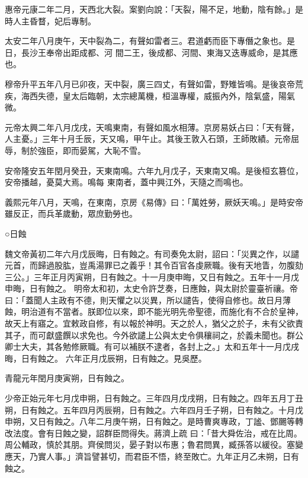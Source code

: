 \begin{pinyinscope}
 惠帝元康二年二月，天西北大裂。案劉向說：「天裂，陽不足，地動，陰有餘。」是時人主昏瞀，妃后專制。



 太安二年八月庚午，天中裂為二，有聲如雷者三。君道虧而臣下專僭之象也。是日，長沙王奉帝出距成都、河
 間二王，後成都、河間、東海又迭專威命，是其應也。



 穆帝升平五年八月已卯夜，天中裂，廣三四丈，有聲如雷，野雉皆鳴。是後哀帝荒疾，海西失德，皇太后臨朝，太宗總萬機，桓溫專權，威振內外，陰氣盛，陽氣微。



 元帝太興二年八月戊戌，天鳴東南，有聲如風水相薄。京房易妖占曰：「天有聲，人主憂。」三年十月壬辰，天又鳴，甲午止。其後王敦入石頭，王師敗績。元帝屈辱，制於強臣，即而晏駕，大恥不雪。



 安帝隆安五年閏月癸丑，天東南鳴。六年九月戊子，天東南又鳴。是後桓玄篡位，安帝播越，憂莫大焉。鳴每
 東南者，蓋中興江外，天隨之而鳴也。



 義熙元年八月，天鳴，在東南，京房《易傳》曰：「萬姓勞，厥妖天鳴。」是時安帝雖反正，而兵革歲動，眾庶勤勞也。



 ○日蝕



 魏文帝黃初二年六月戊辰晦，日有蝕之。有司奏免太尉，詔曰：「災異之作，以譴元首，而歸過股肱，豈禹湯罪已之義乎！其令百官各虔厥職。後有天地眚，勿腹劾三公。」三年正月丙寅朔，日有蝕之。十一月庚申晦，又日有蝕之。五年十一月戊申晦，日有蝕之。
 明帝太和初，太史令許芝奏，日應蝕，與太尉於靈臺祈禳。帝曰：「蓋聞人主政有不德，則天懼之以災異，所以譴告，使得自修也。故日月薄蝕，明治道有不當者。朕即位以來，即不能光明先帝聖德，而施化有不合於皇神，故天上有寤之。宜敕政自修，有以報於神明。天之於人，猶父之於子，未有父欲責其子，而可獻盛饌以求免也。今外欲譴上公與太史令俱穰祠之，於義未聞也。群公卿士大夫，其各勉修厥職。有可以補朕不逮者，各封上之。」太和五年十一月戊戌晦，日有蝕之。
 六年正月戊辰朔，日有蝕之。見吳歷。



 青龍元年閏月庚寅朔，日有蝕之。



 少帝正始元年七月戊申朔，日有蝕之。三年四月戊戌朔，日有蝕之。四年五月丁丑朔，日有蝕之。五年四月丙辰朔，日有蝕之。六年四月壬子朔，日有蝕之。十月戊申朔，又日有蝕之。八年二月庚午朔，日有蝕之。是時曹爽專政，丁謐、鄧颺等轉改法度。會有日蝕之變，詔群臣問得失。蔣濟上疏
 曰：「昔大舜佐治，戒在比周。周公輔政，慎於其朋。齊侯問災，晏子對以布惠；魯君問異，臧孫答以緩役。塞變應天，乃實人事。」濟旨譬甚切，而君臣不悟，終至敗亡。九年正月乙未朔，日有蝕之。




\end{pinyinscope}
